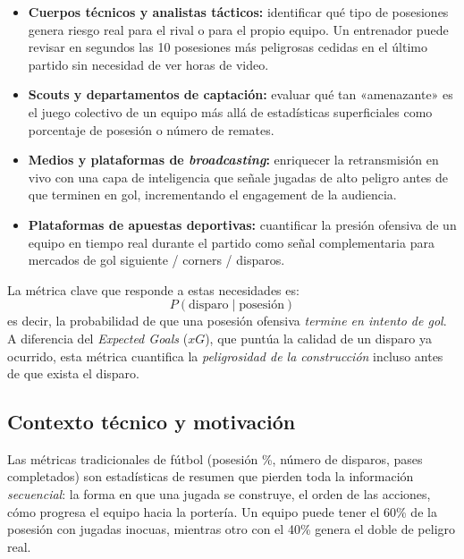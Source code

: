 \documentclass[12pt,a4paper]{article}
\begin{document}
\begin{itemize}[leftmargin=1.5em]
    \item \textbf{Cuerpos técnicos y analistas tácticos:} identificar qué tipo de
          posesiones genera riesgo real para el rival o para el propio equipo.
          Un entrenador puede revisar en segundos las 10 posesiones más peligrosas
          cedidas en el último partido sin necesidad de ver horas de video.

    \item \textbf{Scouts y departamentos de captación:} evaluar qué tan «amenazante»
          es el juego colectivo de un equipo más allá de estadísticas superficiales
          como porcentaje de posesión o número de remates.

    \item \textbf{Medios y plataformas de \textit{broadcasting}:} enriquecer la
          retransmisión en vivo con una capa de inteligencia que señale jugadas
          de alto peligro antes de que terminen en gol, incrementando el engagement
          de la audiencia.

    \item \textbf{Plataformas de apuestas deportivas:} cuantificar la presión
          ofensiva de un equipo en tiempo real durante el partido como señal
          complementaria para mercados de gol siguiente / corners / disparos.
\end{itemize}

La métrica clave que responde a estas necesidades es:
\[
    P(\text{disparo} \mid \text{posesión})
\]
es decir, la probabilidad de que una posesión ofensiva \emph{termine en intento de
gol}. A diferencia del \textit{Expected Goals} ($xG$), que puntúa la calidad de
un disparo ya ocurrido, esta métrica cuantifica la \emph{peligrosidad de la
construcción} incluso antes de que exista el disparo.

\subsection{Contexto técnico y motivación}

Las métricas tradicionales de fútbol (posesión \%, número de disparos, pases
completados) son estadísticas de resumen que pierden toda la información
\emph{secuencial}: la forma en que una jugada se construye, el orden de las
acciones, cómo progresa el equipo hacia la portería. Un equipo puede tener el 60\%
de la posesión con jugadas inocuas, mientras otro con el 40\% genera el doble de
peligro real.
\end{document}
